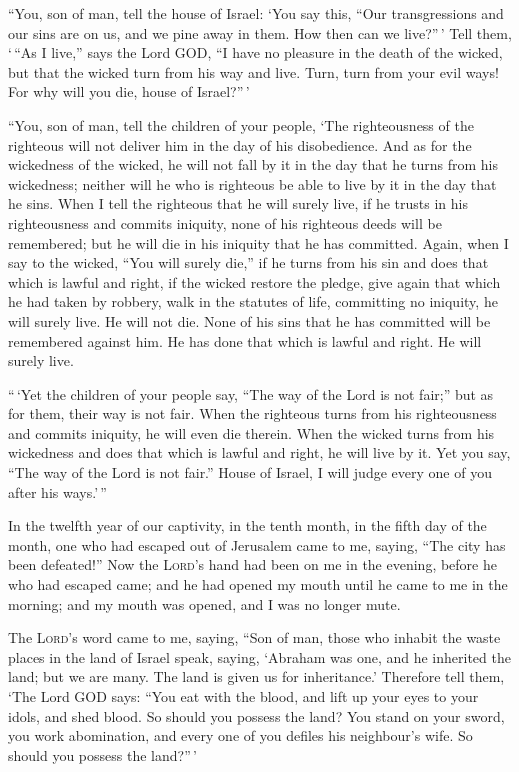  ``You, son of man, tell the house of Israel: `You say
this, ``Our transgressions and our sins are on us, and we pine away in
them. How then can we live?''\,'  Tell them, `\,``As I
live,'' says the Lord GOD, ``I have no pleasure in the death of the
wicked, but that the wicked turn from his way and live. Turn, turn from
your evil ways! For why will you die, house of Israel?''\,'

 ``You, son of man, tell the children of your people,
`The righteousness of the righteous will not deliver him in the day of
his disobedience. And as for the wickedness of the wicked, he will not
fall by it in the day that he turns from his wickedness; neither will he
who is righteous be able to live by it in the day that he sins.
 When I tell the righteous that he will surely live, if
he trusts in his righteousness and commits iniquity, none of his
righteous deeds will be remembered; but he will die in his iniquity that
he has committed.  Again, when I say to the wicked, ``You
will surely die,'' if he turns from his sin and does that which is
lawful and right,  if the wicked restore the pledge, give
again that which he had taken by robbery, walk in the statutes of life,
committing no iniquity, he will surely live. He will not die.
 None of his sins that he has committed will be
remembered against him. He has done that which is lawful and right. He
will surely live.

 ``\,`Yet the children of your people say, ``The way of
the Lord is not fair;'' but as for them, their way is not fair.
 When the righteous turns from his righteousness and
commits iniquity, he will even die therein.  When the
wicked turns from his wickedness and does that which is lawful and
right, he will live by it.  Yet you say, ``The way of the
Lord is not fair.'' House of Israel, I will judge every one of you after
his ways.'\,''

 In the twelfth year of our captivity, in the tenth
month, in the fifth day of the month, one who had escaped out of
Jerusalem came to me, saying, ``The city has been defeated!''
 Now the \textsc{Lord}'s hand had been on me in the
evening, before he who had escaped came; and he had opened my mouth
until he came to me in the morning; and my mouth was opened, and I was
no longer mute.

 The \textsc{Lord}'s word came to me, saying,
 ``Son of man, those who inhabit the waste places in the
land of Israel speak, saying, `Abraham was one, and he inherited the
land; but we are many. The land is given us for inheritance.'
 Therefore tell them, `The Lord GOD says: ``You eat with
the blood, and lift up your eyes to your idols, and shed blood. So
should you possess the land?  You stand on your sword,
you work abomination, and every one of you defiles his neighbour's wife.
So should you possess the land?''\,'

